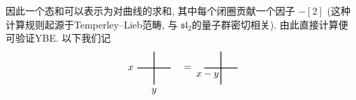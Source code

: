 \documentclass[twoside]{article}
\begin{document}

因此一个态和可以表示为对曲线的求和, 其中每个闭圈贡献一个因子 $-[2]$ (这种计算规则起源于Temperley--Lieb范畴, 与 $\mathfrak{sl}_2$的量子群密切相关). 由此直接计算便可验证YBE. 
以下我们记
\[
    \begin{tikzpicture}[
        scale = .6,
        thick
    ]
        \begin{scope}[shift={(0,0)}]
            \draw (-1, 0)--( 0, 0);
            \draw ( 1, 0)--( 0, 0);
            \draw ( 0, 0)--( 0, 1);
            \draw ( 0, 0)--( 0,-1);
            \node at (-1.4, 0) {$x$};
            \node at (0, -1.4) {$y$};
        \end{scope}
        \node at (2, 0) {$=$};
        \begin{scope}[shift={(4,0)}]
            \draw (-1, 0)--( 0, 0);
            \draw ( 1, 0)--( 0, 0);
            \draw ( 0, 0)--( 0, 1);
            \draw ( 0, 0)--( 0,-1);
            \node at (-.8, -.4) {$x - y$};
        \end{scope}
    \end{tikzpicture}    
\]
\end{document}
